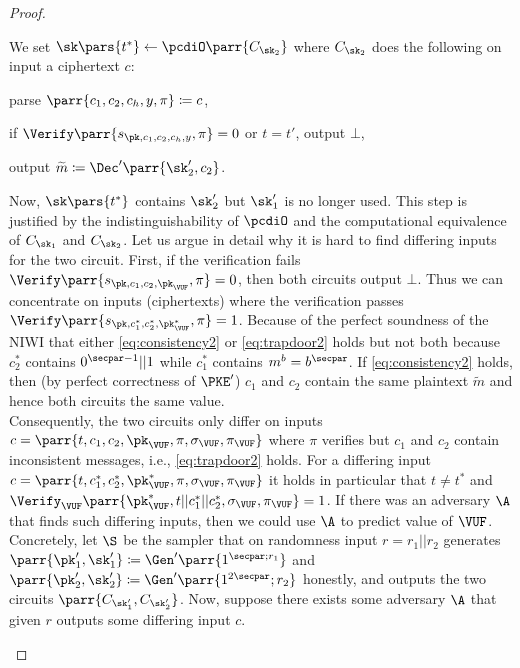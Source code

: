 \begin{proof}
\begin{hybrids}
        \item We set \(\sk\pars{t^*} \gets \pcdiO\parr{C_{\sk_2}}\) where \(C_{\sk_2}\) does the following on input a ciphertext \(c\):
        \begin{sitemize}
            \item parse \(\parr{c_1,c_2,c_h,y,\pi} \coloneqq c\),
            \item if \(\Verify\parr{s_{\pk,c_1,c_2,c_h,y},\pi} = 0\) or \(t=t'\), output \(\bot\),
            \item output \(\widetilde{m} \coloneqq \Dec'\parr{\sk'_2,c_2}\).
        \end{sitemize}
        Now, \(\sk\pars{t^*}\) contains \(\sk'_2\) but \(\sk'_1\) is no longer used.
        This step is justified by the indistinguishability of \(\pcdiO\) and the computational equivalence of \(C_{\sk_1}\) and \(C_{\sk_2}\).
        Let us argue in detail why it is hard to find differing inputs for the two circuit.
        First, if the verification fails \(\Verify\parr{s_{\pk,c_1,c_2,\pk_\VUF},\pi} = 0\),
        then both circuits output \(\bot\).
        Thus we can concentrate on inputs (ciphertexts) where the verification passes \(\Verify\parr{s_{\pk,c^*_1,c^*_2,\pk^*_\VUF},\pi} = 1\).
        Because of the perfect soundness of the NIWI that either \cref{eq:consistency2} or \cref{eq:trapdoor2} holds but not both because \(c^*_2\) contains \(0^{\secpar-1}||1\) while \(c^*_1\) contains \(m^b = b^\secpar\).
        If \cref{eq:consistency2} holds,
        then (by perfect correctness of \(\PKE'\)) \(c_1\) and \(c_2\) contain the same plaintext \(\widetilde{m}\) and hence both circuits the same value.
        \\
        Consequently, the two circuits only differ on inputs \(c = \parr{t,c_1,c_2,\pk_\VUF,\pi,\sigma_\VUF,\pi_\VUF}\) where \(\pi\) verifies but \(c_1\) and \(c_2\) contain inconsistent messages, i.e., \cref{eq:trapdoor2} holds.
        For a differing input \(c = \parr{t,c^*_1,c^*_2,\pk^*_\VUF,\pi,\sigma_\VUF,\pi_\VUF}\) it holds in particular that \(t \neq t^*\) and \(\Verify_\VUF\parr{\pk^*_\VUF,t||c^*_1||c^*_2,\sigma_\VUF,\pi_\VUF}=1\).
        If there was an adversary \(\A\) that finds such differing inputs,
        then we could use \(\A\) to predict value of \(\VUF\).
        Concretely, let \(\S\) be the sampler that on randomness input \(r=r_1||r_2\) generates \(\parr{\pk'_1,\sk'_1} \coloneqq \Gen'\parr{1^{\secpar;r_1}}\) and \(\parr{\pk'_2,\sk'_2} \coloneqq \Gen'\parr{1^{2\secpar};r_2}\) honestly, and outputs the two circuits \(\parr{C_{\sk'_1},C_{\sk'_2}}\).
        Now, suppose there exists some adversary \(\A\) that given \(r\) outputs some differing input \(c\).


\end{hybrids}
\end{proof}
